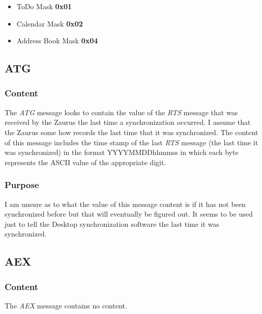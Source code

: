             \begin{itemize}
            \item ToDo Mask \textbf{0x01}
            \item Calendar Mask \textbf{0x02}
            \item Address Book Mask \textbf{0x04}
            \end{itemize}

        \subsection{ATG}

            \subsubsection{Content}

            The \emph{ATG} message looks to contain the value of the
            \emph{RTS} message that was received by the Zaurus the last time a
            synchronization occurred. I assume that the Zaurus some how records
            the last time that it was synchronized. The content of this message
            includes the time stamp of the last \emph{RTS} message (the last
            time it was synchronized) in the format YYYYMMDDhhmmss in which
            each byte represents the ASCII value of the appropriate digit.

            \subsubsection{Purpose}

            I am unsure as to what the value of this message content is if it
            has not been synchronized before but that will eventually be
            figured out. It seems to be used just to tell the Desktop
            synchronization software the last time it was synchronized.

        \subsection{AEX}

            \subsubsection{Content}

            The \emph{AEX} message contains no content.

